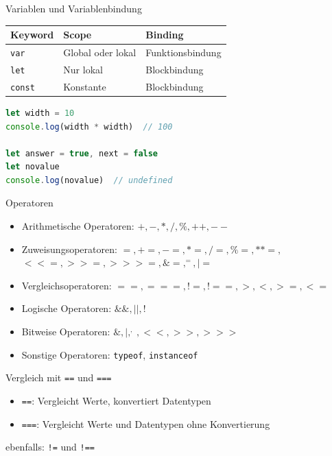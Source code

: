 \begin{concept}{Variablen und Variablenbindung}

    \begin{tabular}{|l|l|l|}
        \hline
        Keyword & Scope & Binding \\ 
        \hline
        \texttt{var} & Global oder lokal & Funktionsbindung \\ 
        \hline
        \texttt{let} & Nur lokal & Blockbindung \\ 
        \hline
        \texttt{const} & Konstante & Blockbindung \\ 
        \hline
    \end{tabular}
\end{concept}

\begin{lstlisting}[language=JavaScript, style=base]
let width = 10
console.log(width * width)  // 100

let answer = true, next = false
let novalue
console.log(novalue)  // undefined
\end{lstlisting}

\begin{theorem}{Operatoren}
    \begin{itemize}
        \item Arithmetische Operatoren: $+, -, *, /, \%, ++, --$
        \item Zuweisungsoperatoren: $=, +=, -=, *=, /=, \%=, **=, $\\$<<=, >>=, >>>=, \&=, ^=, |=$
        \item Vergleichsoperatoren: $==, ===, !=, !==, >, <, >=, <=$
        \item Logische Operatoren: $\&\&, ||, !$
        \item Bitweise Operatoren: $\&, |, ^, ~, <<, >>, >>>$
        \item Sonstige Operatoren: \texttt{typeof}, \texttt{instanceof}
    \end{itemize}
\end{theorem}

\begin{concept}{Vergleich mit \texttt{==} und \texttt{===}}
    \begin{itemize}
        \item \texttt{==}: Vergleicht Werte, konvertiert Datentypen
        \item \texttt{===}: Vergleicht Werte und Datentypen ohne Konvertierung
    \end{itemize}
    ebenfalls: \texttt{!=} und \texttt{!==}
\end{concept}

